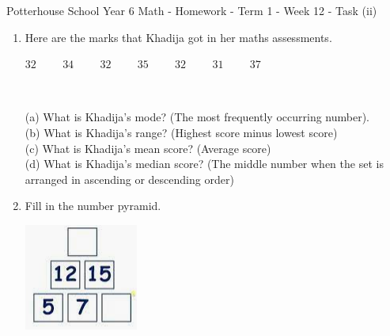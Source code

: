 \documentclass{article}
\date{}
\begin{document}
\fontsize{12}{13} \selectfont %

\begin{center}
Potterhouse School \hspace{3cm} Year 6 Math - Homework - Term 1 - Week 12 - Task (ii) 
\end{center}

\begin{enumerate}

\item \quad Here are the marks that Khadija got in her maths assessments.

\begin{center}
\( \displaystyle 32 \hspace{1cm} 34 \hspace{1cm} 32 \hspace{1cm} 35 \hspace{1cm} 32 \hspace{1cm} 31 \hspace{1cm} 37 \)  
\end{center}

\\

\begin{flushleft}

(a) What is Khadija's mode? (The most frequently occurring number). \vspace{5pt} \\ 
(b) What is Khadija's range? (Highest score minus lowest score)  \vspace{5pt} \\
(c) What is Khadija's mean score? (Average score) \vspace{5pt} \\
(d) What is Khadija's median score? (The middle number when the set is arranged in ascending or descending order) \vspace{5pt} \\

\end{flushleft}

\item \quad Fill in the number pyramid.

\begin{center}
    \includegraphics{Year_6_Mixed_Tests/Homework_Tasks/Addition_pyramid_1.png}
\end{center}


\end{enumerate}
\end{document}
